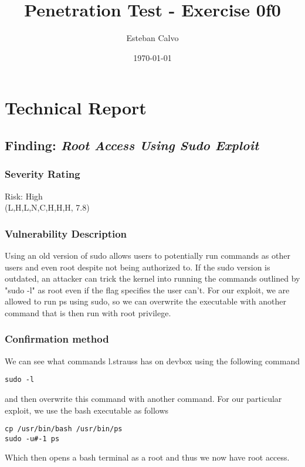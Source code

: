 \documentclass[notitlepage]{article}
\begin{document}
  
\title{Penetration Test - Exercise 0f0}
\author{Esteban Calvo}
\date{\isodate\today}

\maketitle

\tableofcontents

\newpage
\section{Technical Report}
  \subsection{Finding: \emph{Root Access Using Sudo Exploit}}

	\subsubsection*{Severity Rating}
        Risk: High \\
		\cvss(L,H,L,N,C,H,H,H, 7.8)
		
  	\subsubsection*{Vulnerability Description}
  	Using an old version of sudo allows users to potentially run commands as other users and even root despite not being authorized to. If the sudo version is outdated,
    an attacker can trick the kernel into running the commands outlined by "sudo -l" as root even if the flag specifies the user can't. For our exploit, we are allowed to run ps
    using sudo, so we can overwrite the executable with another command that is then run with root privilege. 
  	\subsubsection*{Confirmation method}
  	We can see what commands l.strauss has on devbox using the following command
\begin{verbatim}
sudo -l
\end{verbatim}
    and then overwrite this command with another command. For our particular exploit, we use the bash executable as follows
\begin{verbatim}
cp /usr/bin/bash /usr/bin/ps
sudo -u#-1 ps
\end{verbatim}
    Which then opens a bash terminal as a root and thus we now have root access. 
\end{document}
